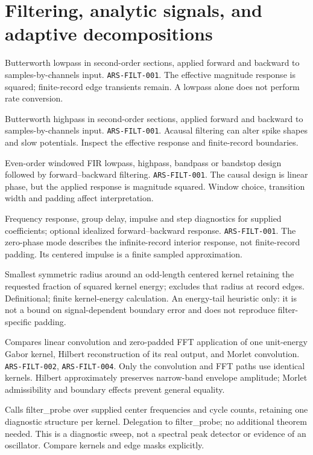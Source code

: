\section{Filtering, analytic signals, and adaptive decompositions}
{Butterworth lowpass in second-order sections, applied forward and backward to samples-by-channels input.}
{\texttt{ARS-FILT-001}.}
{The effective magnitude response is squared; finite-record edge transients remain. A lowpass alone does not perform rate conversion.}

{Butterworth highpass in second-order sections, applied forward and backward to samples-by-channels input.}
{\texttt{ARS-FILT-001}.}
{Acausal filtering can alter spike shapes and slow potentials. Inspect the effective response and finite-record boundaries.}

{Even-order windowed FIR lowpass, highpass, bandpass or bandstop design followed by forward--backward filtering.}
{\texttt{ARS-FILT-001}.}
{The causal design is linear phase, but the applied response is magnitude squared. Window choice, transition width and padding affect interpretation.}

{Frequency response, group delay, impulse and step diagnostics for supplied coefficients; optional idealized forward--backward response.}
{\texttt{ARS-FILT-001}.}
{The zero-phase mode describes the infinite-record interior response, not finite-record padding. Its centered impulse is a finite sampled approximation.}

{Smallest symmetric radius around an odd-length centered kernel retaining the requested fraction of squared kernel energy; excludes that radius at record edges.}
{Definitional; finite kernel-energy calculation.}
{An energy-tail heuristic only: it is not a bound on signal-dependent boundary error and does not reproduce filter-specific padding.}

{Compares linear convolution and zero-padded FFT application of one unit-energy Gabor kernel, Hilbert reconstruction of its real output, and Morlet convolution.}
{\texttt{ARS-FILT-002}, \texttt{ARS-FILT-004}.}
{Only the convolution and FFT paths use identical kernels. Hilbert approximately preserves narrow-band envelope amplitude; Morlet admissibility and boundary effects prevent general equality.}

{Calls filter\_probe over supplied center frequencies and cycle counts, retaining one diagnostic structure per kernel.}
{Delegation to filter\_probe; no additional theorem needed.}
{This is a diagnostic sweep, not a spectral peak detector or evidence of an oscillator. Compare kernels and edge masks explicitly.}

